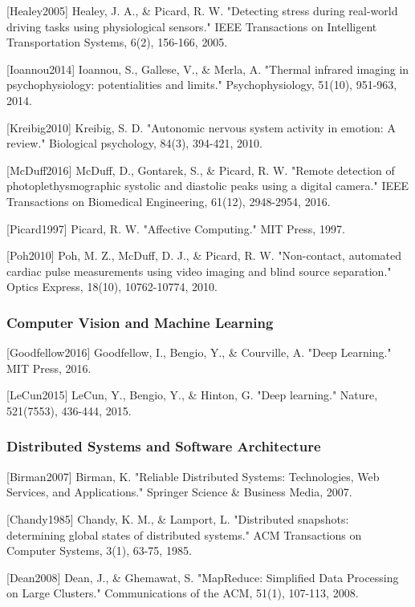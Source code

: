 \documentclass[11pt,a4paper]{report}
\begin{document}
{{[Healey2005] Healey, J. A., \& Picard, R. W. "Detecting stress during real-world driving tasks using physiological
sensors." IEEE Transactions on Intelligent Transportation Systems, 6(2), 156-166, 2005.

[Ioannou2014] Ioannou, S., Gallese, V., \& Merla, A. "Thermal infrared imaging in psychophysiology: potentialities and
limits." Psychophysiology, 51(10), 951-963, 2014.

[Kreibig2010] Kreibig, S. D. "Autonomic nervous system activity in emotion: A review." Biological psychology, 84(3),
394-421, 2010.

[McDuff2016] McDuff, D., Gontarek, S., \& Picard, R. W. "Remote detection of photoplethysmographic systolic and diastolic
peaks using a digital camera." IEEE Transactions on Biomedical Engineering, 61(12), 2948-2954, 2016.

[Picard1997] Picard, R. W. "Affective Computing." MIT Press, 1997.

[Poh2010] Poh, M. Z., McDuff, D. J., \& Picard, R. W. "Non-contact, automated cardiac pulse measurements using video
imaging and blind source separation." Optics Express, 18(10), 10762-10774, 2010.

\subsubsection{Computer Vision and Machine Learning}

[Goodfellow2016] Goodfellow, I., Bengio, Y., \& Courville, A. "Deep Learning." MIT Press, 2016.

[LeCun2015] LeCun, Y., Bengio, Y., \& Hinton, G. "Deep learning." Nature, 521(7553), 436-444, 2015.

\subsubsection{Distributed Systems and Software Architecture}

[Birman2007] Birman, K. "Reliable Distributed Systems: Technologies, Web Services, and Applications." Springer Science \&
Business Media, 2007.

[Chandy1985] Chandy, K. M., \& Lamport, L. "Distributed snapshots: determining global states of distributed systems." ACM
Transactions on Computer Systems, 3(1), 63-75, 1985.

[Dean2008] Dean, J., \& Ghemawat, S. "MapReduce: Simplified Data Processing on Large Clusters." Communications of the
ACM, 51(1), 107-113, 2008.

}}
\end{document}
